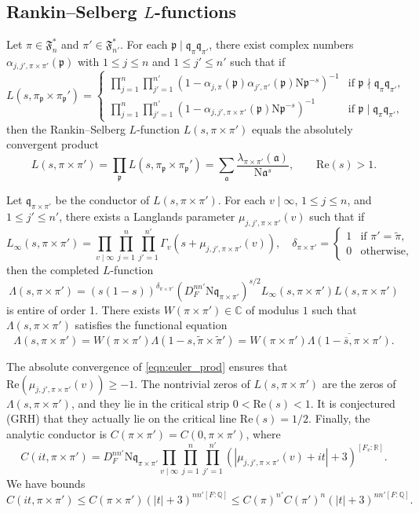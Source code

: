 \documentclass[12pt]{amsart}
\theoremstyle{definition}
\theoremstyle{remark}
\numberwithin{equation}{section}
\theoremstyle{plain}
\renewcommand{\tilde}{\widetilde}
\renewcommand{\bar}{\overline}
\renewcommand{\Re}{\mathrm{Re}}
\newcommand{\re}{\Re}
\newcommand{\N}{\mathrm{N}}
\newcommand{\Q}{\mathbb{Q}}
\newcommand{\R}{\mathbb{R}}
\newcommand{\CC}{\mathbb{C}}
\newcommand{\ka}{\mathfrak{a}}
\newcommand{\kp}{\mathfrak{p}}
\newcommand{\kq}{\mathfrak{q}}
\begin{document}
\subsection{Rankin--Selberg $L$-functions}

Let $\pi\in\mathfrak{F}_n^*$ and $\pi'\in\mathfrak{F}_{n'}^*$. For each $\kp\mid\kq_{\pi}\kq_{\pi'}$, there exist complex numbers $\alpha_{j,j',\pi\times\pi'}(\kp)$ with $1\leq j\leq n$ and $1\leq j'\leq n'$ such that if
\[
L(s,\pi_{\kp}\times\pi_{\kp}')=\begin{cases}
\prod_{j=1}^n \prod_{j'=1}^{n'}(1-\alpha_{j,\pi}(\kp)\alpha_{j',\pi'}(\kp)\N\kp^{-s})^{-1}&\mbox{if $\kp\nmid\kq_{\pi}\kq_{\pi'}$,}\\
\prod_{j=1}^n \prod_{j'=1}^{n'}(1-\alpha_{j,j',\pi\times\pi'}(\kp)\N\kp^{-s})^{-1}&\mbox{if $\kp\mid\kq_{\pi}\kq_{\pi'}$,}
\end{cases}
\]
then the Rankin--Selberg $L$-function $L(s,\pi\times\pi')$ equals the absolutely convergent product
\begin{equation}
\label{eqn:euler_prod}
L(s,\pi\times\pi')=\prod_{\kp}L(s,\pi_{\kp}\times\pi_{\kp}')=\sum_{\ka}\frac{\lambda_{\pi\times\pi'}(\ka)}{\N\ka^s},\qquad \Re(s)>1.	
\end{equation}

Let $\kq_{\pi\times\pi'}$ be the conductor of $L(s,\pi\times\pi')$. For each $v\mid\infty$, $1\leq j\leq n$, and $1\leq j'\leq n'$, there exists a Langlands parameter $\mu_{j,j',\pi\times\pi'}(v)$ such that if
\[
L_{\infty}(s,\pi\times\pi')=\prod_{v\mid\infty}\prod_{j=1}^n \prod_{j'=1}^{n'}\Gamma_v(s+\mu_{j,j',\pi\times\pi'}(v)),\quad \delta_{\pi\times\pi'}=\begin{cases}
	1&\mbox{if $\pi'=\tilde{\pi}$,}\\
	0&\mbox{otherwise,}
\end{cases}
\]
then the completed $L$-function
\[
\Lambda(s,\pi\times\pi')=(s(1-s))^{\delta_{\pi\times\pi'}}(D_F^{nn'}\N\kq_{\pi\times\pi'})^{s/2} L_{\infty}(s,\pi\times\pi')L(s,\pi\times\pi')
\]
is entire of order 1.  There exists $W(\pi\times\pi')\in\CC$ of modulus $1$ such that $\Lambda(s,\pi\times\pi')$ satisfies the functional equation
\[
\Lambda(s,\pi\times\pi')=W(\pi\times\pi')\Lambda(1-s,\tilde{\pi}\times\tilde{\pi}')=W(\pi\times\pi')\overline{\Lambda(1-\bar{s},\pi\times\pi')}.
\]

The absolute convergence of \eqref{eqn:euler_prod} ensures that $\re(\mu_{j,j',\pi\times\pi'}(v))\geq -1$. The nontrivial zeros of $L(s,\pi\times\pi')$ are the zeros of $\Lambda(s,\pi\times\pi')$, and they lie in the critical strip $0<\Re(s)<1$. It is conjectured (GRH) that they actually lie on the critical line $\Re(s)=1/2$. Finally, the analytic conductor is $C(\pi\times\pi')=C(0,\pi\times\pi')$, where
\[
C(it,\pi\times\pi')=D_F^{nn'}\N\kq_{\pi\times\pi'}\prod_{v\mid\infty}\prod_{j=1}^n \prod_{j'=1}^{n'}
(|\mu_{j,j',\pi\times\pi'}(v)+it|+3)^{[F_v:\R]}.
\]
We have bounds \cite[Lemma~A.1]{Wattanawanichkul}
\begin{equation}
\label{eqn:BH}
C(it,\pi\times\pi')\leq C(\pi\times\pi') (|t|+3)^{nn'[F:\Q]}\leq C(\pi)^{n'}C(\pi')^n (|t|+3)^{nn'[F:\Q]}.
\end{equation}
\end{document}
